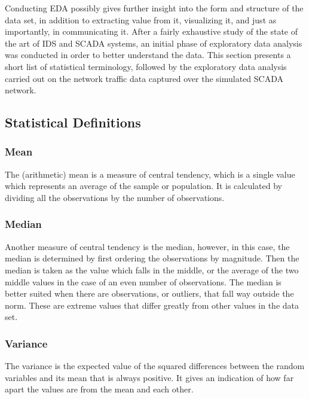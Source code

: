 \documentclass[12pt,]{article}
\begin{document}
Conducting EDA possibly gives further insight into the form and
structure of the data set, in addition to extracting value from it,
visualizing it, and just as importantly, in communicating it. After a
fairly exhaustive study of the state of the art of IDS and SCADA
systems, an initial phase of exploratory data analysis was conducted in
order to better understand the data. This section presents a short list
of statistical terminology, followed by the exploratory data analysis
carried out on the network traffic data captured over the simulated
SCADA network.

\subsection{Statistical Definitions}\label{statistical-definitions}

\subsubsection{Mean}\label{mean}

The (arithmetic) mean is a measure of central tendency, which is a
single value which represents an average of the sample or population. It
is calculated by dividing all the observations by the number of
observations.

\subsubsection{Median}\label{median}

Another measure of central tendency is the median, however, in this
case, the median is determined by first ordering the observations by
magnitude. Then the median is taken as the value which falls in the
middle, or the average of the two middle values in the case of an even
number of observations. The median is better suited when there are
observations, or outliers, that fall way outside the norm. These are
extreme values that differ greatly from other values in the data set.

\subsubsection{Variance}\label{variance}

The variance is the expected value of the squared differences between
the random variables and its mean that is always positive. It gives an
indication of how far apart the values are from the mean and each other.
\end{document}

